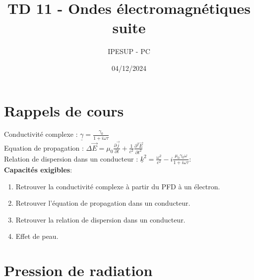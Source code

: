 \documentclass{article}
\title{TD 11 - Ondes électromagnétiques suite}
\author{IPESUP - PC }
\date{04/12/2024}
\begin{document}
\maketitle

\section{Rappels de cours}

Conductivité complexe : $\underline{\gamma} = \frac{\gamma_0}{1 + i \omega \tau}$\\

Equation de propagation : $\Delta {\vec{E}} = \mu_0 \frac{\partial \vec{j}}{\partial t } + \frac{1}{c^2} \frac{\partial^2 \vec{E}}{\partial t^2}$ \\

Relation de dispersion dans un conducteur : $\underline{k}^2 = \frac{\omega^2}{c^2} - i \frac{\mu_0 \gamma_0 \omega}{1 + i \omega \tau}$:\\[1cm]
\textbf{Capacités exigibles}: \\
\begin{enumerate}
  \item Retrouver la conductivité complexe à partir du PFD à un électron. 
  \item Retrouver l'équation de propagation dans un conducteur.
  \item Retrouver la relation de dispersion dans un conducteur. 
  \item Effet de peau. 
\end{enumerate}




\section{Pression de radiation}
\end{document}
